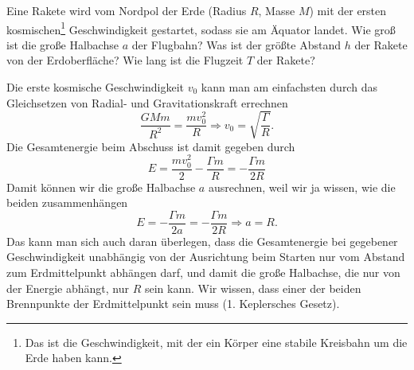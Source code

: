 \begin{Exercise}[title = Ballistische Rakete, origin = J. Kaalda, difficulty =3, label = cmellipse]
	Eine Rakete wird vom Nordpol der Erde (Radius $R$, Masse $M$) mit der ersten kosmischen\footnote[2]{Das ist die Geschwindigkeit, mit der ein Körper eine stabile Kreisbahn um die Erde haben kann.} Geschwindigkeit gestartet, sodass sie am Äquator landet. 
	\Question Wie groß ist die große Halbachse $a$ der Flugbahn?
	\Question Was ist der größte Abstand $h$ der Rakete von der Erdoberfläche?
	\Question Wie lang ist die Flugzeit $T$ der Rakete?
\end{Exercise}
\begin{Answer}[ref = cmellipse]
	\Question Die erste kosmische Geschwindigkeit $v_0$ kann man am einfachsten durch das Gleichsetzen von  Radial- und Gravitationskraft errechnen
	\begin{equation*}\label{cmellipse:vo}
		\frac{GMm}{R^2} = \frac{mv_0^2}{R} \Rightarrow v_0 = \sqrt{\frac{\Gamma}{R}}.
	\end{equation*}
	Die Gesamtenergie beim Abschuss ist damit gegeben durch
	\begin{equation*}
		E = \frac{mv_0^2}{2} - \frac{\Gamma m}{R} = -\frac{\Gamma m}{2R}
	\end{equation*}
	Damit können wir die große Halbachse $a$ ausrechnen, weil wir ja wissen, wie die beiden zusammenhängen
	\begin{equation}\label{cmellipse:sma}
	\boxed{
		E = -\frac{\Gamma m}{2a} = -\frac{\Gamma m}{2R} \Rightarrow a = R.}
	\end{equation}
	Das kann man sich auch daran überlegen, dass die Gesamtenergie bei gegebener Geschwindigkeit unabhängig von der Ausrichtung beim Starten nur vom Abstand zum Erdmittelpunkt abhängen darf, und damit die große Halbachse, die nur von der Energie abhängt, nur $R$ sein kann.
	\Question Wir wissen, dass einer der beiden Brennpunkte der Erdmittelpunkt sein muss (1. Keplersches Gesetz). 
\end{Answer}